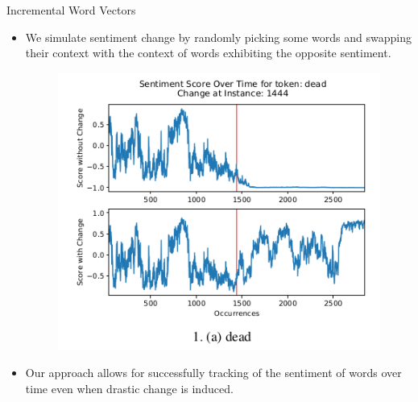\documentclass[handout]{beamer}
\begin{document}
\begin{frame}{Incremental Word Vectors}
\begin{scriptsize}
\begin{itemize}
 \item We simulate sentiment change by randomly picking some words and swapping their context with the context of words exhibiting the opposite sentiment.

   \begin{figure}[h]
        	\includegraphics[scale = 0.35]{pics/change.png}
        \end{figure}

 \item Our approach allows for successfully tracking of the sentiment of words over time even when drastic change is induced.

\end{itemize}


\end{scriptsize}
\end{frame}
\end{document}

